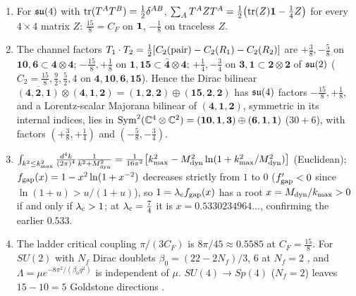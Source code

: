 \begin{proposition}
\label{d4:prop:qym}
\begin{enumerate}[label=(\roman*),leftmargin=2.2em]
\item For $\mathfrak{su}(4)$ with $\operatorname{tr}(T^AT^B)=\tfrac12\delta^{AB}$, $\sum_AT^AZT^A=\tfrac12\bigl(\operatorname{tr}(Z)\mathbf 1-\tfrac14Z\bigr)$ for every $4\times4$ matrix $Z$: $\tfrac{15}8=C_F$ on $\mathbf 1$,
$-\tfrac18$ on traceless $Z$.
\item The channel factors $T_1\cdot T_2=\tfrac12[C_2(\text{pair})-C_2(R_1)-C_2(R_2)]$ are $+\tfrac38,-\tfrac58$ on $\mathbf{10},\mathbf6\subset\mathbf4\otimes\mathbf4$;
$-\tfrac{15}8,+\tfrac18$ on $\mathbf1,\mathbf{15}\subset\bar{\mathbf4}\otimes\mathbf4$; $+\tfrac14,-\tfrac34$ on $\mathbf3,\mathbf1\subset\mathbf2\otimes\mathbf2$ of $\mathfrak{su}(2)$
($C_2=\tfrac{15}8,\tfrac92,\tfrac52,4$ on $\mathbf4,\mathbf{10},\mathbf6,\mathbf{15}$). Hence the Dirac bilinear
$\overline{(\mathbf4,\mathbf2,\mathbf1)}\otimes(\mathbf4,\mathbf1,\mathbf2)=(\mathbf1,\mathbf2,\mathbf2)\oplus(\mathbf{15},\mathbf2,\mathbf2)$ has $\mathfrak{su}(4)$ factors $-\tfrac{15}8,+\tfrac18$, and a
Lorentz-scalar Majorana bilinear of $(\mathbf4,\mathbf1,\mathbf2)$, symmetric in its internal indices, lies in
$\mathrm{Sym}^2(\mathbb{C}^4\otimes\mathbb{C}^2)=(\mathbf{10},\mathbf1,\mathbf3)\oplus(\mathbf6,\mathbf1,\mathbf1)$ ($30+6$), with factors $(+\tfrac38,+\tfrac14)$ and $(-\tfrac58,-\tfrac34)$.
\item $\int_{k^2\le k_{\max}^2}\frac{d^4k}{(2\pi)^4}\frac1{k^2+M_{\rm dyn}^2}=\frac1{16\pi^2}\bigl[k_{\max}^2-M_{\rm dyn}^2\ln(1+k_{\max}^2/M_{\rm dyn}^2)\bigr]$ (Euclidean);
$f_{\rm gap}(x)=1-x^2\ln(1+x^{-2})$ decreases strictly from $1$ to $0$ ($f_{\rm gap}'<0$ since $\ln(1+u)>u/(1+u)$), so $1=\lambda_{\rm c}f_{\rm gap}(x)$ has a
root $x=M_{\rm dyn}/k_{\max}>0$ if and only if $\lambda_{\rm c}>1$; at $\lambda_{\rm c}=\tfrac74$ it is $x=0.5330234964\ldots$, confirming the earlier $0.533$.
\item The ladder critical coupling $\pi/(3C_F)$ \cite{FukudaKugo76,Miransky93} is $8\pi/45\approx0.5585$ at $C_F=\tfrac{15}8$. For $SU(2)$ with $N_f$
Dirac doublets $\beta_0=(22-2N_f)/3$, $6$ at $N_f=2$ \cite{GrossWilczek73,Politzer73}, and $\Lambda=\mu e^{-8\pi^2/(\beta_0g^2)}$ is independent of $\mu$.
$SU(4)\to Sp(4)$ ($N_f=2$) leaves $15-10=5$ Goldstone directions \cite{Peskin80}.
\end{enumerate}
\end{proposition}

